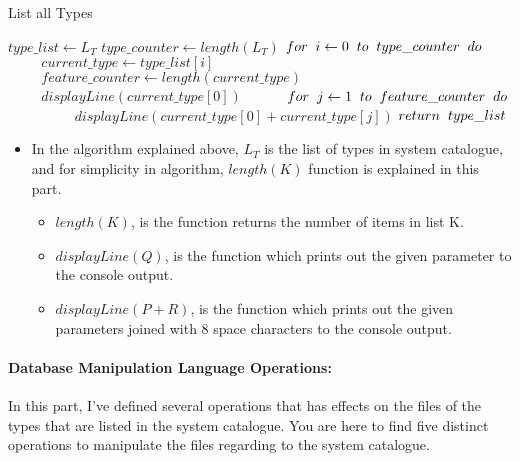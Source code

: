 \documentclass[12pt]{report}
\begin{document}
\newpage

\begin{algorithm}
\caption{List all Types}
\begin{algorithmic}[1]
	\STATE $type\_list \leftarrow L_T$
	\STATE $type\_counter \leftarrow length(L_T)$
	\STATE $for\hspace{0.2cm}i\leftarrow0\hspace{0.2cm}to\hspace{0.2cm}type\_counter\hspace{0.2cm}do$
	\STATE $\hspace{1cm}current\_type \leftarrow type\_list[i]$
	\STATE $\hspace{1cm}feature\_counter \leftarrow length(current\_type)$
	\STATE $\hspace{1cm}displayLine(current\_type[0])$
	\STATE $\hspace{1cm}for\hspace{0.2cm}j\leftarrow1\hspace{0.2cm}to\hspace{0.2cm}feature\_counter\hspace{0.2cm}do$
	\STATE $\hspace{2cm}displayLine(current\_type[0] + current\_type[j])$
	\STATE $return\hspace{0.2cm}type\_list$
\end{algorithmic}
\end{algorithm}

\begin{itemize}
\item In the algorithm explained above, $L_T$ is the list of types in system catalogue, and for simplicity in algorithm, $length(K)$ function is explained in this part.

\begin{itemize}
\item $length(K)$, is the function returns the number of items in list K.
\item $displayLine(Q)$, is the function which prints out the given parameter to the console output.
\item $displayLine(P + R)$, is the function which prints out the given parameters joined with 8 space characters to the console output.
\end{itemize}

\end{itemize}

\newpage

\paragraph{Database Manipulation Language Operations:}
In this part, I've defined several operations that has effects on the files of the types that are listed in the system catalogue. You are here to find five distinct operations to manipulate the files regarding to the system catalogue.
\end{document}
